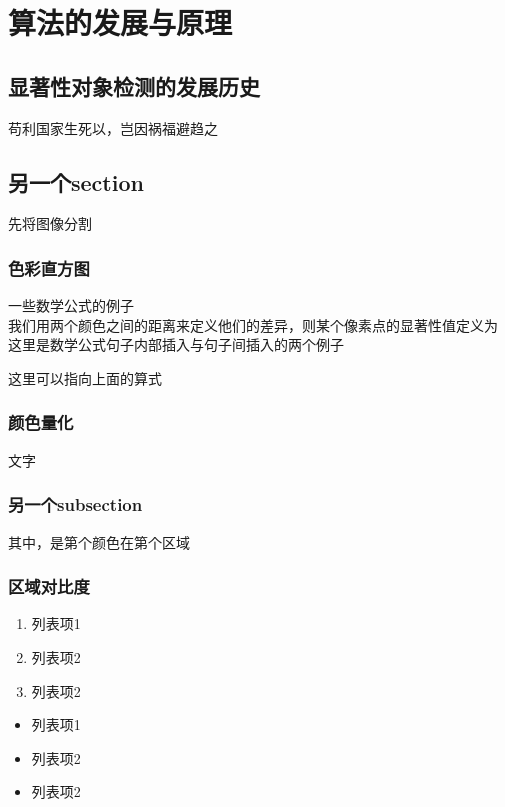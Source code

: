 \chapter{算法的发展与原理}

\section{显著性对象检测的发展历史}

苟利国家生死以，岂因祸福避趋之\cite{730558}
\section{另一个section}

先将图像分割 \cite{Felzenszwalb:2004:EGI:981793.981796}

\subsection{色彩直方图}

一些数学公式的例子\\

我们用两个颜色之间的距离来定义他们的差异，则某个像素点的显著性值定义为
这里是数学公式句子内部插入与句子间插入的两个例子


这里可以指向上面的算式


\subsection{颜色量化}

文字

\subsection{另一个subsection}

其中，是第个颜色在第个区域


\subsection{区域对比度}

\begin{enumerate}
    \item 列表项1
    \item 列表项2
    \item 列表项2
\end{enumerate}

\begin{itemize}
    \item 列表项1
    \item 列表项2
    \item 列表项2
\end{itemize}